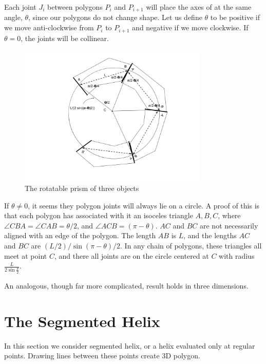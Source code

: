 \documentclass[11pt]{article}
\begin{document}
{Each joint $J_i$ between polygons $P_i$ and $P_{i+1}$ will place the axes of at the same angle, $\theta$, since
our polygons do not change shape. Let us define $\theta$ to be positive
if we move anti-clockwise from $P_i$ to $P_{i+1}$ and negative if we move clockwise. 
If $\theta = 0$, the joints will be collinear.

\begin{figure}
     \centering
     \includegraphics[width=0.80\textwidth]{figures/2DPolygonStacking.png}
     \caption{The rotatable prism of three objects}
  \label{fig:prismdiagram}
\end{figure}

If $\theta \neq 0$, it seems they polygon joints will always lie on a circle. A proof of this
is that each polygon has associated with it an isoceles triangle $A,B,C$, where $\angle CBA = \angle CAB = \theta/2$,
and $\angle ACB = (\pi - \theta)$. $AC$ and $BC$ are not necessarily aligned with an edge of the polygon.
The length $AB$ is $L$, and the lengths $AC$ and $BC$ are
$(L/2) / \sin{(\pi - \theta)/2}$. In any chain of polygons, these triangles all meet at point $C$, and there all
joints are on the circle centered at $C$ with radius $\frac{L}{2 \sin{\frac{\theta}{2}}}$.

An analogous, though far more complicated, result holds in three dimensions.

\label{sec:2d}
\section{The Segmented Helix}

In this section we consider segmented helix, or a helix evaluated only at regular points. Drawing lines between these
points create 3D polygon.

}
\end{document}
